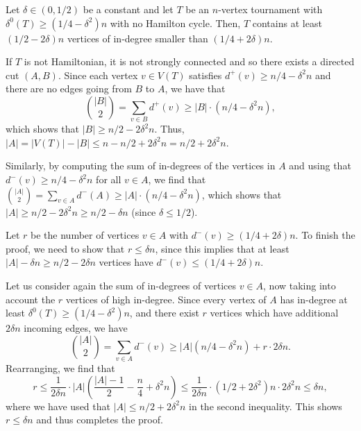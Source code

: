 \documentclass[10pt,a4paper]{amsart}
\makeatletter
\renewenvironment{proof}[1][\proofname] {\par\pushQED{\qed}\normalfont\topsep6\p@\@plus6\p@\relax\trivlist\item[\hskip\labelsep\textit{#1}\@addpunct{.}]\ignorespaces}{\popQED\endtrivlist\@endpefalse}
\makeatother
\begin{document}
\begin{claim}\label{claim:stability}
Let $\delta\in (0, 1/2)$ be a constant and let $T$ be an $n$-vertex tournament with $\delta^0(T)\geq (1/4-\delta^2)n$ with no Hamilton cycle. Then, $T$ contains at least $(1/2-2\delta) n$ vertices of in-degree smaller than $(1/4+2\delta)n$. 
\end{claim}

\begin{proof}
If $T$ is not Hamiltonian, it is not strongly connected and so there exists a directed cut $(A, B)$. Since each vertex $v\in V(T)$ satisfies $d^+(v)\geq n/4-\delta^2 n$ and there are no edges going from $B$ to $A$, we have that 
\[\binom{|B|}{2}=\sum_{v\in B}d^+(v)\geq |B|\cdot (n/4-\delta^2 n),\]
which shows that $|B|\geq n/2-2\delta^2 n$. Thus, $|A|=|V(T)|-|B|\leq n-n/2+2\delta^2 n=n/2+2\delta^2 n$. 

Similarly, by computing the sum of in-degrees of the vertices in $A$ and using that $d^-(v)\geq n/4-\delta^2 n$ for all $v\in A$, we find that $\binom{|A|}{2}=\sum_{v\in A}d^-(A)\geq |A|\cdot (n/4-\delta^2 n)$, which shows that $|A|\geq n/2-2\delta^2 n\geq n/2-\delta n$ (since $\delta\leq 1/2$).%

Let $r$ be the number of vertices $v\in A$ with $d^-(v)\geq (1/4+2\delta) n$. To finish the proof, we need to show that $r\leq \delta n$, since this implies that at least $|A|-\delta n\geq n/2-2\delta n$ vertices have $d^-(v)\leq (1/4+2\delta) n$. 

Let us consider again the sum of in-degrees of vertices $v\in A$, now taking into account the $r$ vertices of high in-degree. %
Since every vertex of $A$ has in-degree at least $\delta^0(T)\geq (1/4-\delta^2)n$, and there exist $r$ vertices which have additional $2\delta n$ incoming edges, we have
\[\binom{|A|}{2} = \sum_{v\in A}d^-(v)\geq |A| (n/4-\delta^2 n) + r\cdot 2\delta n.\]
Rearranging, we find that 
\[r\leq \frac{1}{2\delta n}\cdot |A|\left(\frac{|A|-1}{2}-\frac{n}{4}+\delta^2 n\right) \leq \frac{1}{2\delta n}\cdot (1/2+2\delta^2) n \cdot 2\delta^2 n  \leq \delta n,\]
where we have used that $|A|\leq n/2+2\delta^2 n$ in the second inequality. This shows $r\leq \delta n$ and thus completes the proof.
\end{proof}
\end{document}
